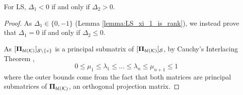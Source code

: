 \begin{lemma}    \label{lemma:LS_delta_1_improvement_means_delta_2_worse}
    For LS, $\Delta_{1} < 0 $ if and only if $ \Delta_{2} > 0$.
\end{lemma}
\begin{proof}
As $\Delta_{1} \in \{0,-1\}$ (Lemma \ref{lemma:LS_xi_1_is_rank}), we instead prove that $\Delta_{1} = 0$ if and only if $ \Delta_{2} \leq 0$.

      As $[\bm{\Pi}_{bl(\mathcal{K})}]_{\mathcal{S} \backslash \{v\}}$ is a principal submatrix of $[\bm{\Pi}_{bl(\mathcal{K})}]_{\mathcal{S}}$, by Cauchy's Interlacing Theorem \cite[p.~59]{bhatia2013matrix},
     \begin{equation}
         0 \leq \mu_{1} \leq \lambda_{1} \leq \dots \leq \lambda_{n} \leq \mu_{n+1} \leq 1 \label{eq:MUUM_nonnegative}
     \end{equation} 
    where the outer bounds come from the fact that both matrices are principal submatrices of $\bm{\Pi}_{bl(\mathcal{K})}$, an orthogonal projection matrix.
    

\end{proof}
